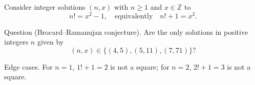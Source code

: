 Consider integer solutions $(n,x)$ with $n\ge 1$ and $x\in\mathbb Z$ to
\[
 n! = x^2 - 1,\quad\text{equivalently}\quad n!+1=x^2.
\]

Question (Brocard--Ramanujan conjecture).
Are the only solutions in positive integers $n$ given by
\[
(n,x)\in\{(4,5),(5,11),(7,71)\}?
\]

Edge cases.
For $n=1$, $1!+1=2$ is not a square; for $n=2$, $2!+1=3$ is not a square.
